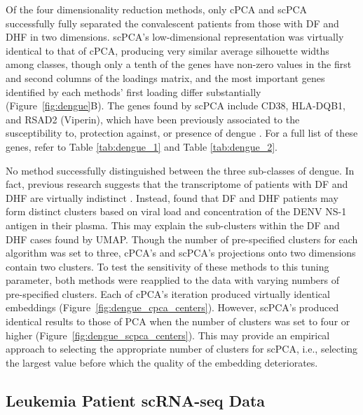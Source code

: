 Of the four dimensionality reduction methods, only cPCA and scPCA successfully fully separated the convalescent patients from those with DF and DHF in two dimensions. scPCA's low-dimensional representation was virtually identical to that of cPCA, producing very similar average silhouette widths among classes, though only a tenth of the genes have non-zero values in the first and second columns of the loadings matrix, and the most important genes identified by each methods' first loading differ substantially (Figure~\ref{fig:dengue}B). The genes found by scPCA include CD38, HLA-DQB1, and RSAD2 (Viperin), which have been previously associated to the susceptibility to, protection against, or presence of dengue \cite{Castaneda2016,Cardozo2014,Fitzgerald2011}. For a full list of these genes, refer to Table \ref{tab:dengue_1} and Table \ref{tab:dengue_2}. 

No method successfully distinguished between the three sub-classes of dengue. In fact, previous research suggests that the transcriptome of patients with DF and DHF are virtually indistinct \cite{Kwissa2014}. Instead, \citet{Kwissa2014} found that DF and DHF patients may form distinct clusters based on viral load and concentration of the DENV NS-1 antigen in their plasma. This may explain the sub-clusters within the DF and DHF cases found by UMAP. Though the number of pre-specified clusters for each algorithm was set to three, cPCA's and scPCA's projections onto two dimensions contain two clusters. To test the sensitivity of these methods to this tuning parameter, both methods were reapplied to the data with varying numbers of pre-specified clusters. Each of cPCA's iteration produced virtually identical embeddings (Figure~\ref{fig:dengue_cpca_centers}). However, scPCA's produced identical results to those of PCA when the number of clusters was set to four or higher (Figure~\ref{fig:dengue_scpca_centers}). This may provide an empirical approach to selecting the appropriate number of clusters for scPCA, i.e., selecting the largest value before which the quality of the embedding deteriorates.


\subsection{Leukemia Patient scRNA-seq Data}\label{leukemia_data}

